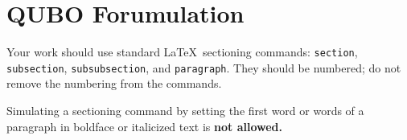 
\section{QUBO Forumulation} \label{sec:qubo}

Your work should use standard \LaTeX\ sectioning commands:
\verb|section|, \verb|subsection|, \verb|subsubsection|, and
\verb|paragraph|. They should be numbered; do not remove the numbering
from the commands.

Simulating a sectioning command by setting the first word or words of
a paragraph in boldface or italicized text is {\bfseries not allowed.}